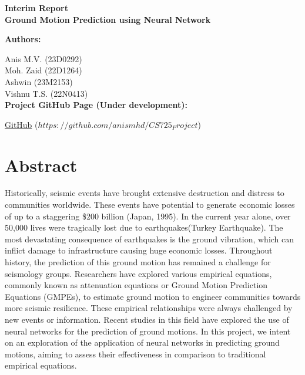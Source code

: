 \documentclass[a4paper,10pt]{article}
\begin{document}
\noindent 
\begin{center}
\textbf{{\large Interim Report \\ \Large Ground Motion Prediction using Neural Network}} \\
\end{center}


\noindent 
\textbf{Authors:}

\hspace{1 cm} Anis M.V. (23D0292) \\

\hspace{1 cm} Moh. Zaid (22D1264) \\

\hspace{1 cm} Ashwin (23M2153) \\

\hspace{1 cm} Vishnu T.S. (22N0413) \\

\noindent 
\textbf{Project GitHub Page (Under development):}

\hspace{1 cm} \href{https://github.com/anismhd/CS725_Project}{GitHub} ($https://github.com/anismhd/CS725_Project$) \\


\section{Abstract}

Historically, seismic events have brought extensive destruction and distress to communities worldwide.
These events have potential to generate economic losses of up to a staggering \$200 billion (Japan, 1995).
In the current year alone, over 50,000 lives were tragically lost due to earthquakes(Turkey Earthquake).
The most devastating consequence of earthquakes is the ground vibration, which can inflict damage to infrastructure causing huge economic losses.
Throughout history, the prediction of this ground motion has remained a challenge for seismology groups. 
Researchers have explored various empirical equations, commonly known as attenuation equations or Ground Motion Prediction Equations (GMPEs), to estimate ground motion to engineer communities towards more seismic resilience. 
These empirical relationships were always challenged by new events or information. 
Recent studies in this field have explored the use of neural networks for the prediction of ground motions. 
In this project, we intent on an exploration of the application of neural networks in predicting ground motions, aiming to assess their effectiveness in comparison to traditional empirical equations.
\end{document}
